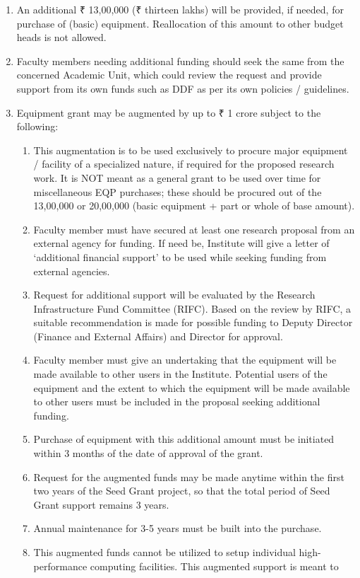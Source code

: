 \documentclass[
  10pt,
  a5paper,
  10pt,
  openany]{amsbook}
\providecommand{\tightlist}{%
  \setlength{\itemsep}{0pt}\setlength{\parskip}{0pt}}
\begin{document}
\begin{enumerate}
\def\labelenumi{\arabic{enumi}.}
\setcounter{enumi}{4}
\tightlist
\item
  An additional ₹ 13,00,000 (₹ thirteen lakhs) will be provided, if
  needed, for purchase of (basic) equipment. Reallocation of this amount
  to other budget heads is not allowed.
\item
  Faculty members needing additional funding should seek the same from
  the concerned Academic Unit, which could review the request and
  provide support from its own funds such as DDF as per its own policies
  / guidelines.
\item
  Equipment grant may be augmented by up to ₹ 1 crore subject to the
  following:

  \begin{enumerate}
  \def\labelenumii{\alph{enumii}.}
  \tightlist
  \item
    This augmentation is to be used exclusively to procure major
    equipment / facility of a specialized nature, if required for the
    proposed research work. It is NOT meant as a general grant to be
    used over time for miscellaneous EQP purchases; these should be
    procured out of the 13,00,000 or 20,00,000 (basic equipment + part
    or whole of base amount).
  \item
    Faculty member must have secured at least one research proposal from
    an external agency for funding. If need be, Institute will give a
    letter of `additional financial support' to be used while seeking
    funding from external agencies.
  \item
    Request for additional support will be evaluated by the Research
    Infrastructure Fund Committee (RIFC). Based on the review by RIFC, a
    suitable recommendation is made for possible funding to Deputy
    Director (Finance and External Affairs) and Director for approval.
  \item
    Faculty member must give an undertaking that the equipment will be
    made available to other users in the Institute. Potential users of
    the equipment and the extent to which the equipment will be made
    available to other users must be included in the proposal seeking
    additional funding.
  \item
    Purchase of equipment with this additional amount must be initiated
    within 3 months of the date of approval of the grant.
  \item
    Request for the augmented funds may be made anytime within the first
    two years of the Seed Grant project, so that the total period of
    Seed Grant support remains 3 years.
  \item
    Annual maintenance for 3-5 years must be built into the purchase.
  \item
    This augmented funds cannot be utilized to setup individual
    high-performance computing facilities. This augmented support is
    meant to


\end{enumerate}
\end{enumerate}
\end{document}
